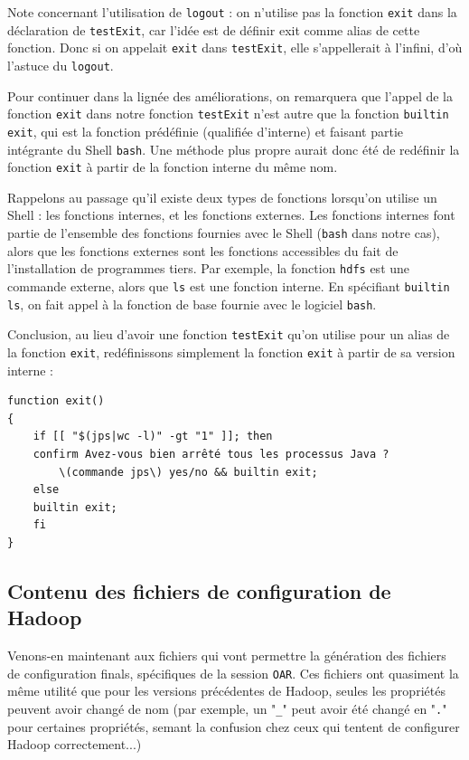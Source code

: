 \par Note concernant l'utilisation de \texttt{logout} : on n'utilise pas la fonction \texttt{exit} dans la déclaration de \texttt{testExit}, car l'idée est de définir exit comme alias de cette fonction. Donc si on appelait \texttt{exit} dans \texttt{testExit}, elle s'appellerait à l'infini, d'où l'astuce du \texttt{logout}.

\par Pour continuer dans la lignée des améliorations, on remarquera que l'appel de la fonction \texttt{exit} dans notre fonction \texttt{testExit} n'est autre que la fonction \texttt{builtin exit}, qui est la fonction prédéfinie (qualifiée d'interne) et faisant partie intégrante du Shell \texttt{bash}. Une méthode plus propre aurait donc été de redéfinir la fonction \texttt{exit} à partir de la fonction interne du même nom.
\par Rappelons au passage qu'il existe deux types de fonctions lorsqu'on utilise un Shell : les fonctions internes, et les fonctions externes. Les fonctions internes font partie de l'ensemble des fonctions fournies avec le Shell (\texttt{bash} dans notre cas), alors que les fonctions externes sont les fonctions accessibles du fait de l'installation de programmes tiers. Par exemple, la fonction \texttt{hdfs} est une commande externe, alors que \texttt{ls} est une fonction interne. En spécifiant \texttt{builtin ls}, on fait appel à la fonction de base fournie avec le logiciel \texttt{bash}.
\par Conclusion, au lieu d'avoir une fonction \texttt{testExit} qu'on utilise pour un alias de la fonction \texttt{exit}, redéfinissons simplement la fonction \texttt{exit} à partir de sa version interne :

\begin{verbatim}
function exit()
{
    if [[ "$(jps|wc -l)" -gt "1" ]]; then
	confirm Avez-vous bien arrêté tous les processus Java ?
        \(commande jps\) yes/no && builtin exit;
    else
	builtin exit;
    fi
}
\end{verbatim}

\subsection{Contenu des fichiers de configuration de Hadoop}
\label{sec:contenu-des-fichiers}

\par Venons-en maintenant aux fichiers qui vont permettre la génération des fichiers de configuration finals, spécifiques de la session \texttt{OAR}. Ces fichiers ont quasiment la même utilité que pour les versions précédentes de Hadoop, seules les propriétés peuvent avoir changé de nom (par exemple, un "\texttt{\_}" peut avoir été changé en "\texttt{.}" pour certaines propriétés, semant la confusion chez ceux qui tentent de configurer Hadoop correctement...)


